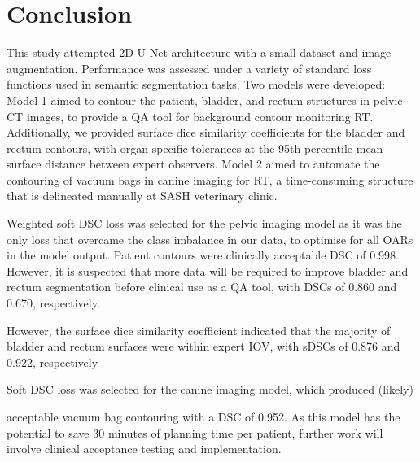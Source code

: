 \chapter{Conclusion}
\label{ch:conclusion}

This study attempted 2D U-Net architecture with a small dataset and image augmentation. Performance was assessed under a variety of standard loss functions used in semantic segmentation tasks. Two models were developed: Model 1 aimed to contour the patient, bladder, and rectum structures in pelvic CT images, to provide a QA tool for background contour monitoring RT. Additionally, we provided surface dice similarity coefficients for the bladder and rectum contours, with organ-specific tolerances at the 95th percentile mean surface distance between expert observers. Model 2 aimed to automate the contouring of vacuum bags in canine imaging for RT, a time-consuming structure that is delineated manually at SASH veterinary clinic.

Weighted soft DSC loss was selected for the pelvic imaging model as it was the only loss that overcame the class imbalance in our data, to optimise for all OARs in the model output. Patient contours were clinically acceptable DSC of 0.998. However, it is suspected that more data will be required to improve bladder and rectum segmentation before clinical use as a QA tool, with DSCs of 0.860 and 0.670, respectively.

 However, the surface dice similarity coefficient indicated that the majority of bladder and rectum surfaces were within expert IOV, with sDSCs of 0.876 and 0.922, respectively

Soft DSC loss was selected for the canine imaging model, which produced (likely)


acceptable vacuum bag contouring with a DSC of 0.952. As this model has the potential to save 30 minutes of planning time per patient, further work will involve clinical acceptance testing and implementation.


